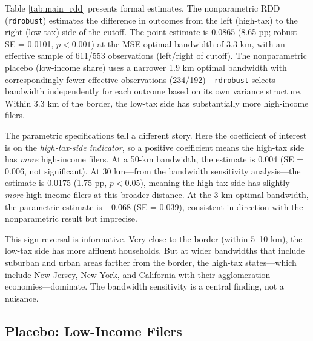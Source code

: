 \documentclass[12pt]{article}
\begin{document}
Table \ref{tab:main_rdd} presents formal estimates. The nonparametric RDD (\texttt{rdrobust}) estimates the difference in outcomes from the left (high-tax) to the right (low-tax) side of the cutoff. The point estimate is 0.0865 (8.65 pp; robust SE = 0.0101, $p < 0.001$) at the MSE-optimal bandwidth of 3.3 km, with an effective sample of 611/553 observations (left/right of cutoff). The nonparametric placebo (low-income share) uses a narrower 1.9 km optimal bandwidth with correspondingly fewer effective observations (234/192)---\texttt{rdrobust} selects bandwidth independently for each outcome based on its own variance structure. Within 3.3 km of the border, the low-tax side has substantially more high-income filers.

The parametric specifications tell a different story. Here the coefficient of interest is on the \textit{high-tax-side indicator}, so a positive coefficient means the high-tax side has \textit{more} high-income filers. At a 50-km bandwidth, the estimate is 0.004 (SE = 0.006, not significant). At 30 km---from the bandwidth sensitivity analysis---the estimate is 0.0175 (1.75 pp, $p < 0.05$), meaning the high-tax side has slightly \textit{more} high-income filers at this broader distance. At the 3-km optimal bandwidth, the parametric estimate is $-0.068$ (SE = 0.039), consistent in direction with the nonparametric result but imprecise.

This sign reversal is informative. Very close to the border (within 5--10 km), the low-tax side has more affluent households. But at wider bandwidths that include suburban and urban areas farther from the border, the high-tax states---which include New Jersey, New York, and California with their agglomeration economies---dominate. The bandwidth sensitivity is a central finding, not a nuisance.



\subsection{Placebo: Low-Income Filers}
\end{document}
